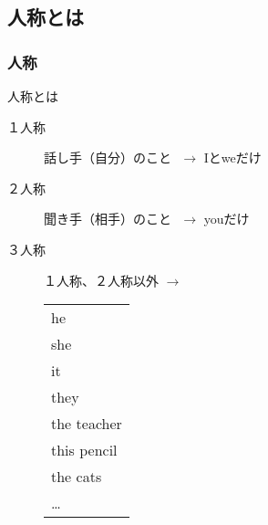 \documentclass[aspectratio=169,xcolor={dvipsnames,table}]{beamer}
\begin{document}
\subsection{人称とは}
\begin{frame}[plain,label=ninsyo]\frametitle{人称}

\begin{alertblock}{人称とは}
\begin{description}
\item[１人称] 話し手（自分）のこと\pause{}\,\,{} $\longrightarrow$ Iとweだけ\pause
\item[２人称] 聞き手（相手）のこと\pause{}\,\,{} $\longrightarrow$ youだけ\pause
\item[３人称] １人称、２人称以外\pause{}\hspace{15pt} $\longrightarrow$%
 \begin{tabular}[t]{@{}l}
he\\\pause
she\\\pause
it\\\pause
they\\\pause
the teacher\\\pause
this pencil\\\pause
the cats\\\pause
\ldots
 \end{tabular}
\end{description}
\end{alertblock}
\end{frame}
\end{document}
